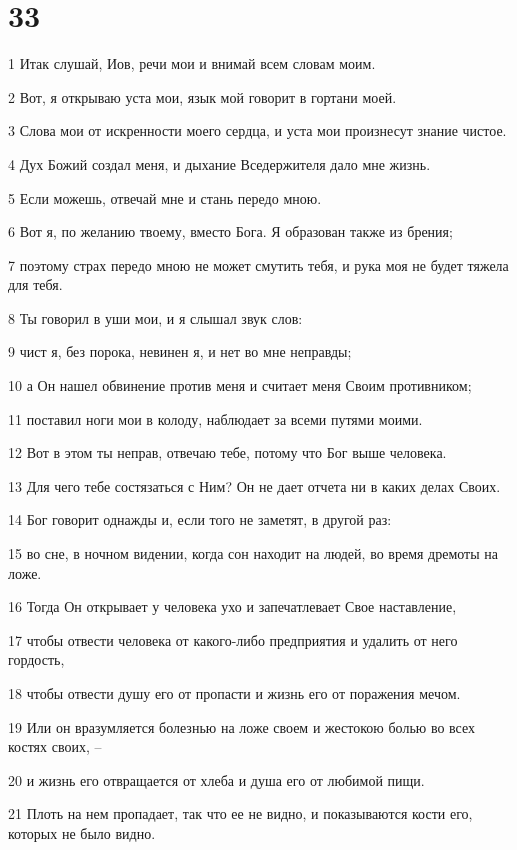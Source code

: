 \chapter{33}

\par 1 Итак слушай, Иов, речи мои и внимай всем словам моим.
\par 2 Вот, я открываю уста мои, язык мой говорит в гортани моей.
\par 3 Слова мои от искренности моего сердца, и уста мои произнесут знание чистое.
\par 4 Дух Божий создал меня, и дыхание Вседержителя дало мне жизнь.
\par 5 Если можешь, отвечай мне и стань передо мною.
\par 6 Вот я, по желанию твоему, вместо Бога. Я образован также из брения;
\par 7 поэтому страх передо мною не может смутить тебя, и рука моя не будет тяжела для тебя.
\par 8 Ты говорил в уши мои, и я слышал звук слов:
\par 9 чист я, без порока, невинен я, и нет во мне неправды;
\par 10 а Он нашел обвинение против меня и считает меня Своим противником;
\par 11 поставил ноги мои в колоду, наблюдает за всеми путями моими.
\par 12 Вот в этом ты неправ, отвечаю тебе, потому что Бог выше человека.
\par 13 Для чего тебе состязаться с Ним? Он не дает отчета ни в каких делах Своих.
\par 14 Бог говорит однажды и, если того не заметят, в другой раз:
\par 15 во сне, в ночном видении, когда сон находит на людей, во время дремоты на ложе.
\par 16 Тогда Он открывает у человека ухо и запечатлевает Свое наставление,
\par 17 чтобы отвести человека от какого-либо предприятия и удалить от него гордость,
\par 18 чтобы отвести душу его от пропасти и жизнь его от поражения мечом.
\par 19 Или он вразумляется болезнью на ложе своем и жестокою болью во всех костях своих, --
\par 20 и жизнь его отвращается от хлеба и душа его от любимой пищи.
\par 21 Плоть на нем пропадает, так что ее не видно, и показываются кости его, которых не было видно.
